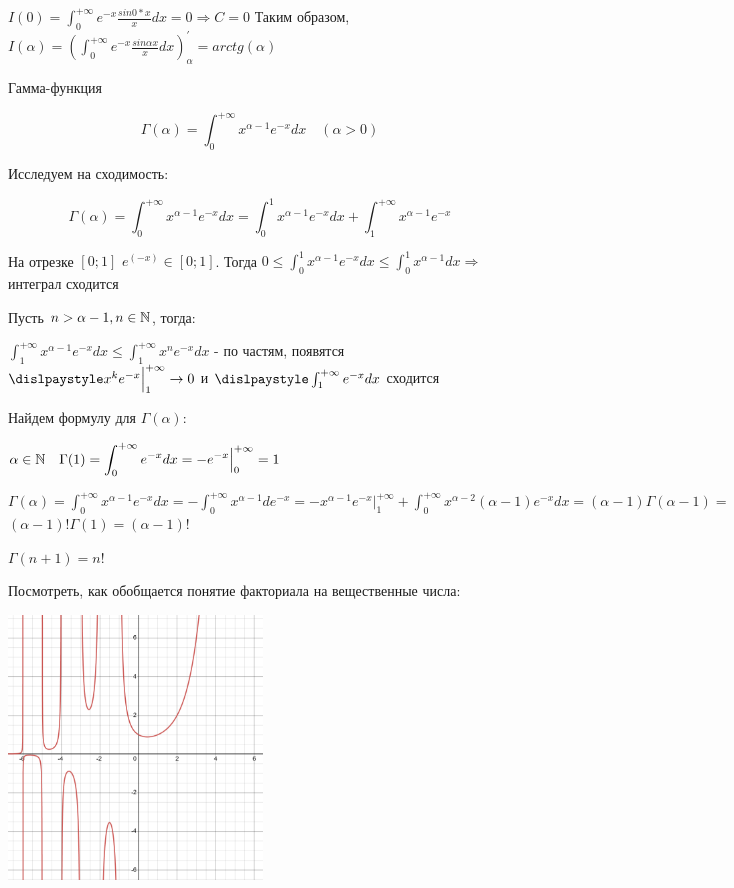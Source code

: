 \documentclass[12pt]{article}
\begin{document}
    $\displaystyle I(0) = \int^{+\infty}_0 e^{-x} \frac{sin 0 * x}{x}dx = 0 \Longrightarrow C = 0$
    Таким образом, $\displaystyle I(\alpha) = (\int^{+\infty}_0 e^{-x} \frac{sin\alpha x}{x} dx)^\prime_\alpha = arctg(\alpha)$

    \Ex Гамма-функция

    \[\Gamma(\alpha) = \int^{+\infty}_0 x^{\alpha - 1} e^{-x} dx \quad (\alpha > 0)\]

    Исследуем на сходимость:

    \[\Gamma(\alpha) = \int^{+\infty}_0 x^{\alpha - 1} e^{-x} dx = \int^{1}_0 x^{\alpha - 1} e^{-x} dx + \int^{+\infty}_1 x^{\alpha - 1} e^{-x}\]

    На отрезке $[0; 1]$ $e^(-x) \in [0;1]$.
    Тогда $\displaystyle 0 \leq \int^{1}_0 x^{\alpha - 1} e^{-x} dx \leq \int^{1}_0 x^{\alpha - 1} dx \Longrightarrow$ интеграл сходится

    Пусть $n > \alpha - 1, n \in \mathbb{N}$, тогда:

    $\displaystyle \int^{+\infty}_1 x^{\alpha - 1} e^{-x} dx \leq \int^{+\infty}_1 x^{n} e^{-x} dx$ - по частям, появятся $\dislpaystyle x^{k} e^{-x} \Big|^{+\infty}_1 \rightarrow 0$ и $\dislpaystyle \int^{+\infty}_1 e^{-x} dx$ сходится

    Найдем формулу для $\Gamma(\alpha)$:

    $\displaystyle \alpha \in \mathbb{N} \quad \Gamma(1) = \int^{+\infty}_0 e^{-x} dx = -e^{-x} \Big|^{+\infty}_{0} = 1$

    $\displaystyle \Gamma(\alpha) = \int^{+\infty}_0 x^{\alpha - 1} e^{-x} dx = -\int^{+\infty}_0 x^{\alpha - 1} de^{-x} = -x^{\alpha - 1}e^{-x} \Big|^{+\infty}_1 + \int^{+\infty}_0 x^{\alpha - 2} (\alpha - 1) e^{-x} dx = (\alpha - 1) \Gamma(\alpha - 1) = $
    $(\alpha - 1)! \Gamma(1) = (\alpha - 1)!$

    $\Gamma(n + 1) = n!$

    \Lab Посмотреть, как обобщается понятие факториала на вещественные числа:

    \includegraphics[height=70mm]{calculus/images/calculus_2024_02_28_1}
\end{document}
